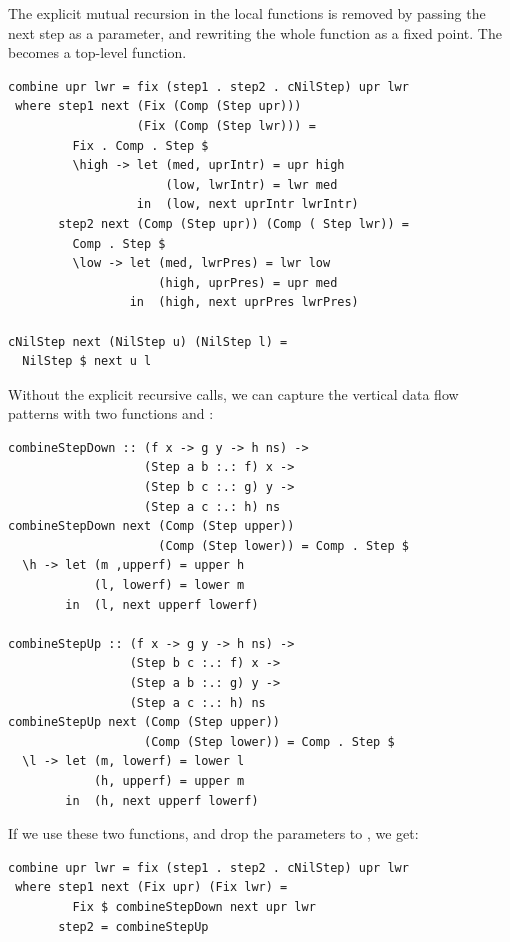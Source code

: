 \documentclass[preprint,natbib]{sigplanconf}
\begin{document}
The explicit mutual recursion in the local functions is removed by passing the next step as a parameter, and rewriting the whole function as a fixed point. The  becomes a top-level function.

\begin{small} %
\begin{verbatim}
combine upr lwr = fix (step1 . step2 . cNilStep) upr lwr
 where step1 next (Fix (Comp (Step upr))) 
                  (Fix (Comp (Step lwr))) = 
         Fix . Comp . Step $ 
         \high -> let (med, uprIntr) = upr high
                      (low, lwrIntr) = lwr med
                  in  (low, next uprIntr lwrIntr)
       step2 next (Comp (Step upr)) (Comp ( Step lwr)) = 
         Comp . Step $
         \low -> let (med, lwrPres) = lwr low
                     (high, uprPres) = upr med
                 in  (high, next uprPres lwrPres)

cNilStep next (NilStep u) (NilStep l) = 
  NilStep $ next u l
\end{verbatim}%
\end{small}

Without the explicit recursive calls, we can capture the vertical data flow patterns with two functions  and :

\begin{small} 
\begin{verbatim}
combineStepDown :: (f x -> g y -> h ns) -> 
                   (Step a b :.: f) x -> 
                   (Step b c :.: g) y -> 
                   (Step a c :.: h) ns
combineStepDown next (Comp (Step upper)) 
                     (Comp (Step lower)) = Comp . Step $
  \h -> let (m ,upperf) = upper h
            (l, lowerf) = lower m
        in  (l, next upperf lowerf)   

combineStepUp :: (f x -> g y -> h ns) ->
                 (Step b c :.: f) x ->
                 (Step a b :.: g) y ->
                 (Step a c :.: h) ns
combineStepUp next (Comp (Step upper)) 
                   (Comp (Step lower)) = Comp . Step $ 
  \l -> let (m, lowerf) = lower l
            (h, upperf) = upper m
        in  (h, next upperf lowerf)   
\end{verbatim}%
\end{small}

If we use these two functions, and drop the parameters to , we get:

\begin{small}%
\begin{verbatim}
combine upr lwr = fix (step1 . step2 . cNilStep) upr lwr
 where step1 next (Fix upr) (Fix lwr) = 
         Fix $ combineStepDown next upr lwr
       step2 = combineStepUp
\end{verbatim}%
\end{small}
\end{document}
